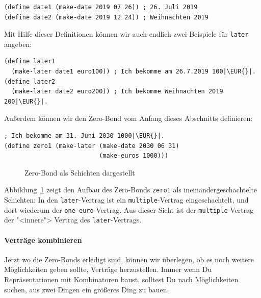 %
\begin{lstlisting}
(define date1 (make-date 2019 07 26)) ; 26. Juli 2019
(define date2 (make-date 2019 12 24)) ; Weihnachten 2019
\end{lstlisting}
%
Mit Hilfe dieser Definitionen können wir auch endlich zwei Beispiele
für \lstinline{later} angeben:
%
\begin{lstlisting}
(define later1
  (make-later date1 euro100)) ; Ich bekomme am 26.7.2019 100|\EUR{}|.
(define later2
  (make-later date2 euro200)) ; Ich bekomme Weihnachten 2019 200|\EUR{}|.
\end{lstlisting}
%
Außerdem können wir den Zero-Bond vom Anfang dieses Abschnitts
definieren:
%
\begin{lstlisting}
; Ich bekomme am 31. Juni 2030 1000|\EUR{}|.
(define zero1 (make-later (make-date 2030 06 31)
                          (make-euros 1000)))
\end{lstlisting}

\begin{figure}[tb]
  \centering
{}
  
  \caption{Zero-Bond als Schichten dargestellt}
  \label{fig:zero-bond}
\end{figure}

\noindent Abbildung~\ref{fig:zero-bond} zeigt den Aufbau des
Zero-Bonds \lstinline{zero1} als ineinandergeschachtelte Schichten:
In den \lstinline{later}-Vertrag ist ein \lstinline{multiple}-Vertrag
eingeschachtelt, und dort wiederum der \lstinline{one-euro}-Vertrag.
Aus dieser Sicht ist der \lstinline{multiple}-Vertrag der
"<innere"> Vertrag des \lstinline{later}-Vertrags.

\paragraph{Verträge kombinieren}

Jetzt wo die Zero-Bonds erledigt sind, können wir überlegen, ob es
noch weitere Möglichkeiten geben sollte, Verträge herzustellen.  Immer
wenn Du Repräsentationen mit Kombinatoren baust, solltest Du nach
Möglichkeiten suchen, aus zwei Dingen ein größeres Ding zu bauen.

